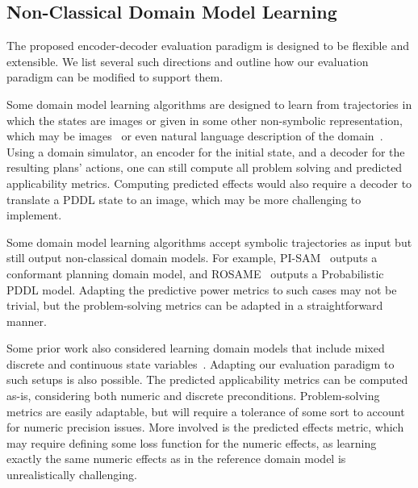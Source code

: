 
\subsection{Non-Classical Domain Model Learning}
The proposed encoder-decoder evaluation paradigm is designed to be flexible and extensible. 
We list several such directions and outline how our evaluation paradigm can be modified to support them. 

Some domain model learning algorithms are designed to learn from trajectories in which the states are images or given in some other non-symbolic representation, which may be images~\citep{asai2020learning,asai2022classical,xi2024neuro} or even natural language description of the domain~\citep{lindsay2017framer,liu2023llm+, guan2023leveraging}.%
Using a domain simulator, an encoder for the initial state, and a decoder for the resulting plans' actions, one can still compute all problem solving and predicted applicability metrics. 
Computing predicted effects would also require a decoder to translate a PDDL state to an image, which may be more challenging to implement. 


Some domain model learning algorithms accept symbolic trajectories as input but still output non-classical domain models. For example, PI-SAM~\citep{le2024learning} outputs a conformant planning domain model, and ROSAME~\citep{xi2024neuro} outputs a Probabilistic PDDL model. 
Adapting the predictive power metrics to such cases may not be trivial, but the problem-solving metrics can be adapted in a straightforward manner. 


Some prior work also considered learning domain models that include mixed discrete and continuous state variables~\citep{segura2021discovering,mordoch2023learning}. 
Adapting our evaluation paradigm to such setups is also possible. 
The predicted applicability metrics can be computed as-is, considering both numeric and discrete preconditions.
Problem-solving metrics are easily adaptable, but will require a tolerance of some sort to account for numeric precision issues. 
More involved is the predicted effects metric, which may require defining some loss function for the numeric effects, as learning exactly the same numeric effects as in the reference domain model is unrealistically challenging. 


